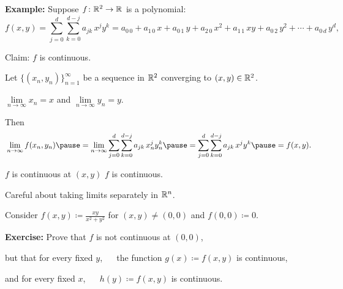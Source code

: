 \documentclass[10pt,aspectratio=169]{beamer}
\begin{document}
\begin{frame}

\textbf{Example:}
Suppose $f \colon {\mathbb{R}}^2 \to {\mathbb{R}}$ is a polynomial:
\begin{equation*}
f(x,y) =
\sum_{j=0}^d
\sum_{k=0}^{d-j}
a_{jk}\,x^jy^k =
a_{0\,0} + a_{1\,0} \, x +
a_{0\,1} \, y+  
a_{2\,0} \, x^2+  
a_{1\,1} \, xy+  
a_{0\,2} \, y^2+ \cdots +
a_{0\,d} \, y^d ,
\end{equation*}

\pause
Claim: $f$ is continuous.

\pause
\medskip

Let $\bigl\{ (x_n,y_n) \bigr\}_{n=1}^\infty$ be a sequence in ${\mathbb{R}}^2$
converging to $(x,y) \in {\mathbb{R}}^2$.

\pause
\thus \quad
$\lim\limits_{n\to\infty} x_n = x$ and $\lim\limits_{n\to\infty} y_n = y$.

\pause
\medskip

Then
\[
\lim_{n\to\infty}
f(x_n,y_n)
\pause
=
\lim_{n\to\infty}
\sum_{j=0}^d
\sum_{k=0}^{d-j}
a_{jk} \, x_n^jy_n^k 
\pause
=
\sum_{j=0}^d
\sum_{k=0}^{d-j}
a_{jk} \, x^jy^k
\pause
=
f(x,y) .
\]

\pause
\thus \quad $f$ is continuous at $(x,y)$
\pause
\wthus $f$ is continuous.

\end{frame}

\begin{frame}

Careful about taking limits separately in ${\mathbb{R}}^n$.

\pause

Consider $f(x,y) \coloneqq \frac{xy}{x^2+y^2}$ for $(x,y) \not= (0,0)$ and
$f(0,0) \coloneqq 0$.

\pause
\begin{center}
\end{center}

\pause
\textbf{Exercise:} Prove that $f$ is not continuous at $(0,0)$,

\pause
but that for every fixed $y$, ~~ the function $g(x) \coloneqq f(x,y)$ is
continuous,

\pause
and for every fixed $x$, ~~ $h(y) \coloneqq f(x,y)$ is continuous.


\end{frame}
\end{document}
